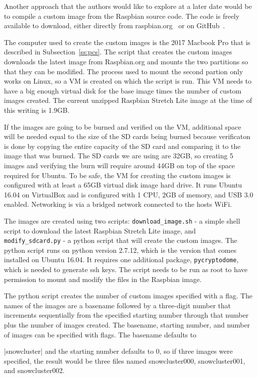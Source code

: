 Another approach that the authors would like to explore at a later
date would be to compile a custom image from the Raspbian source
code. The code is freely available to download, either directly from
raspbian.org~\cite{hid-sp18-419-raspbian-distro} or on
GitHub~\cite{hid-sp18-419-pi-gen}.

The computer used to create the custom images is the 2017 Macbook Pro
that is described in Subsection~\ref{ss:pcs}. The script that creates
the custom images downloads the latest image from Raspbian.org and
mounts the two partitions so that they can be modified. The process
used to mount the second partion only works on Linux, so a VM is
created on which the script is run. This VM needs to have a big enough
virtual disk for the base image times the number of custom images
created. The current unzipped Raspbian Stretch Lite image at the time
of this writing is 1.9GB.

If the images are going to be burned and verified on the VM,
additional space will be needed equal to the size of the SD cards
being burned because verificaton is done by copying the entire
capacity of the SD card and comparing it to the image that was
burned. The SD cards we are using are 32GB, so creating 5 images and
verifying the burn will require around 44GB on top of the space
required for Ubuntu. To be safe, the VM for creating the custom images
is configured with at least a 65GB virtual disk image hard drive.  It
runs Ubuntu 16.04 on VirtualBox and is configured with 1 CPU, 2GB of
memory, and USB 3.0 enabled. Networking is via a bridged network
connected to the hosts WiFi.

The images are created using two scripts: \verb|download_image.sh| - a
simple shell script to download the latest Raspbian Stretch Lite
image, and \verb|modify_sdcard.py| - a python script that will create
the custom images. The python script runs on python version 2.7.12,
which is the version that comes installed on Ubuntu 16.04. It requires
one additional package, \verb|pycryptodome|, which is needed to
generate ssh keys. The script needs to be run as root to have
permission to mount and modify the files in the Raspbian image.

The python script creates the number of custom images specified with a
flag. The names of the images are a basename followed by a three-digit
number that increments sequentially from the specified starting number
through that number plus the number of images created. The basename,
starting number, and number of images can be specified with flags. The
basename defaults to \item|snowcluster| and the starting number
defaults to 0, so if three images were specified, the result would be
three files named snowcluster000, snowcluster001, and snowcluster002.

